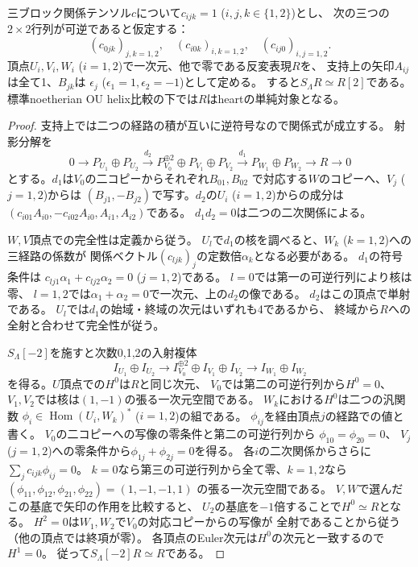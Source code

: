 \begin{lemma}[二頂点ずつに支持を持つ周期単純対象]
\label{lem:ou-complement-periodic-simple}
三ブロック関係テンソル$c$について$c_{ijk}=1$ ($i,j,k\in\{1,2\}$)とし、
次の三つの$2\times2$行列が可逆であると仮定する：
\[
 (c_{0jk})_{j,k=1,2},\quad
 (c_{i0k})_{i,k=1,2},\quad
 (c_{ij0})_{i,j=1,2}.
\]
頂点$U_i,V_i,W_i$ ($i=1,2$)で一次元、他で零である反変表現$R$を、
支持上の矢印$A_{ij}$は全て1、$B_{jk}$は
$\epsilon_j$ ($\epsilon_1=1,\epsilon_2=-1$)として定める。
すると$S_\Lambda R\simeq R[2]$である。
標準noetherian OU helix比較の下では$R$はheartの単純対象となる。
\end{lemma}
\begin{proof}
支持上では二つの経路の積が互いに逆符号なので関係式が成立する。
射影分解を
\[
 0\longrightarrow P_{U_1}\oplus P_{U_2}
 \xrightarrow{d_2} P_{V_0}^{\oplus2}\oplus P_{V_1}\oplus P_{V_2}
 \xrightarrow{d_1} P_{W_1}\oplus P_{W_2}
 \longrightarrow R\longrightarrow0
\]
とする。$d_1$は$V_0$の二コピーからそれぞれ$B_{01},B_{02}$
で対応する$W$のコピーへ、$V_j$ ($j=1,2$)からは
$(B_{j1},-B_{j2})$で写す。$d_2$の$U_i$ ($i=1,2$)からの成分は
$(c_{i01}A_{i0},-c_{i02}A_{i0},A_{i1},A_{i2})$である。
$d_1d_2=0$は二つの二次関係による。

$W,V$頂点での完全性は定義から従う。
$U_l$で$d_1$の核を調べると、$W_k$ ($k=1,2$)への三経路の係数が
関係ベクトル$(c_{ljk})_j$の定数倍$\alpha_k$となる必要がある。
$d_1$の符号条件は
$c_{lj1}\alpha_1+c_{lj2}\alpha_2=0$ ($j=1,2$)である。
$l=0$では第一の可逆行列により核は零、
$l=1,2$では$\alpha_1+\alpha_2=0$で一次元、上の$d_2$の像である。
$d_2$はこの頂点で単射である。
$U_l$では$d_1$の始域・終域の次元はいずれも4であるから、
終域から$R$への全射と合わせて完全性が従う。

$S_\Lambda[-2]$を施すと次数0,1,2の入射複体
\[
 I_{U_1}\oplus I_{U_2}\longrightarrow
 I_{V_0}^{\oplus2}\oplus I_{V_1}\oplus I_{V_2}\longrightarrow
 I_{W_1}\oplus I_{W_2}
\]
を得る。$U$頂点での$H^0$は$R$と同じ次元、
$V_0$では第二の可逆行列から$H^0=0$、
$V_1,V_2$では核は$(1,-1)$の張る一次元空間である。
$W_k$における$H^0$は二つの汎関数
$\phi_i\in\operatorname{Hom}(U_i,W_k)^*$ ($i=1,2$)の組である。
$\phi_{ij}$を経由頂点$j$の経路での値と書く。
$V_0$の二コピーへの写像の零条件と第二の可逆行列から
$\phi_{10}=\phi_{20}=0$、
$V_j$ ($j=1,2$)への零条件から$\phi_{1j}+\phi_{2j}=0$を得る。
各$i$の二次関係からさらに$\sum_j c_{ijk}\phi_{ij}=0$。
$k=0$なら第三の可逆行列から全て零、$k=1,2$なら
$(\phi_{11},\phi_{12},\phi_{21},\phi_{22})=(1,-1,-1,1)$
の張る一次元空間である。
$V,W$で選んだこの基底で矢印の作用を比較すると、
$U_2$の基底を$-1$倍することで$H^0\simeq R$となる。
$H^2=0$は$W_1,W_2$で$V_0$の対応コピーからの写像が
全射であることから従う（他の頂点では終項が零）。
各頂点のEuler次元は$H^0$の次元と一致するので$H^1=0$。
従って$S_\Lambda[-2]R\simeq R$である。


\end{proof}
